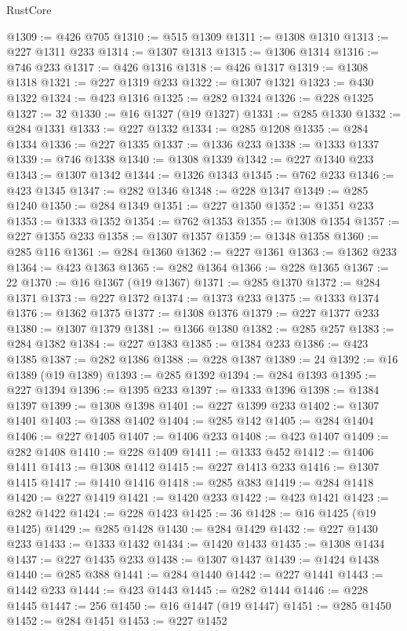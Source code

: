 \begin{lexlean}{RustCore}
\begin{coremodule}
@1309 := @426 @705
@1310 := @515 @1309
@1311 := @1308 @1310
@1313 := @227 @1311 @233
@1314 := @1307 @1313
@1315 := @1306 @1314
@1316 := @746 @233
@1317 := @426 @1316
@1318 := @426 @1317
@1319 := @1308 @1318
@1321 := @227 @1319 @233
@1322 := @1307 @1321
@1323 := @430 @1322
@1324 := @423 @1316
@1325 := @282 @1324
@1326 := @228 @1325
@1327 := 32
@1330 := @16 @1327 (@19 @1327)
@1331 := @285 @1330
@1332 := @284 @1331
@1333 := @227 @1332
@1334 := @285 @1208
@1335 := @284 @1334
@1336 := @227 @1335
@1337 := @1336 @233
@1338 := @1333 @1337
@1339 := @746 @1338
@1340 := @1308 @1339
@1342 := @227 @1340 @233
@1343 := @1307 @1342
@1344 := @1326 @1343
@1345 := @762 @233
@1346 := @423 @1345
@1347 := @282 @1346
@1348 := @228 @1347
@1349 := @285 @1240
@1350 := @284 @1349
@1351 := @227 @1350
@1352 := @1351 @233
@1353 := @1333 @1352
@1354 := @762 @1353
@1355 := @1308 @1354
@1357 := @227 @1355 @233
@1358 := @1307 @1357
@1359 := @1348 @1358
@1360 := @285 @116
@1361 := @284 @1360
@1362 := @227 @1361
@1363 := @1362 @233
@1364 := @423 @1363
@1365 := @282 @1364
@1366 := @228 @1365
@1367 := 22
@1370 := @16 @1367 (@19 @1367)
@1371 := @285 @1370
@1372 := @284 @1371
@1373 := @227 @1372
@1374 := @1373 @233
@1375 := @1333 @1374
@1376 := @1362 @1375
@1377 := @1308 @1376
@1379 := @227 @1377 @233
@1380 := @1307 @1379
@1381 := @1366 @1380
@1382 := @285 @257
@1383 := @284 @1382
@1384 := @227 @1383
@1385 := @1384 @233
@1386 := @423 @1385
@1387 := @282 @1386
@1388 := @228 @1387
@1389 := 24
@1392 := @16 @1389 (@19 @1389)
@1393 := @285 @1392
@1394 := @284 @1393
@1395 := @227 @1394
@1396 := @1395 @233
@1397 := @1333 @1396
@1398 := @1384 @1397
@1399 := @1308 @1398
@1401 := @227 @1399 @233
@1402 := @1307 @1401
@1403 := @1388 @1402
@1404 := @285 @142
@1405 := @284 @1404
@1406 := @227 @1405
@1407 := @1406 @233
@1408 := @423 @1407
@1409 := @282 @1408
@1410 := @228 @1409
@1411 := @1333 @452
@1412 := @1406 @1411
@1413 := @1308 @1412
@1415 := @227 @1413 @233
@1416 := @1307 @1415
@1417 := @1410 @1416
@1418 := @285 @383
@1419 := @284 @1418
@1420 := @227 @1419
@1421 := @1420 @233
@1422 := @423 @1421
@1423 := @282 @1422
@1424 := @228 @1423
@1425 := 36
@1428 := @16 @1425 (@19 @1425)
@1429 := @285 @1428
@1430 := @284 @1429
@1432 := @227 @1430 @233
@1433 := @1333 @1432
@1434 := @1420 @1433
@1435 := @1308 @1434
@1437 := @227 @1435 @233
@1438 := @1307 @1437
@1439 := @1424 @1438
@1440 := @285 @388
@1441 := @284 @1440
@1442 := @227 @1441
@1443 := @1442 @233
@1444 := @423 @1443
@1445 := @282 @1444
@1446 := @228 @1445
@1447 := 256
@1450 := @16 @1447 (@19 @1447)
@1451 := @285 @1450
@1452 := @284 @1451
@1453 := @227 @1452

\end{coremodule}
\end{lexlean}
